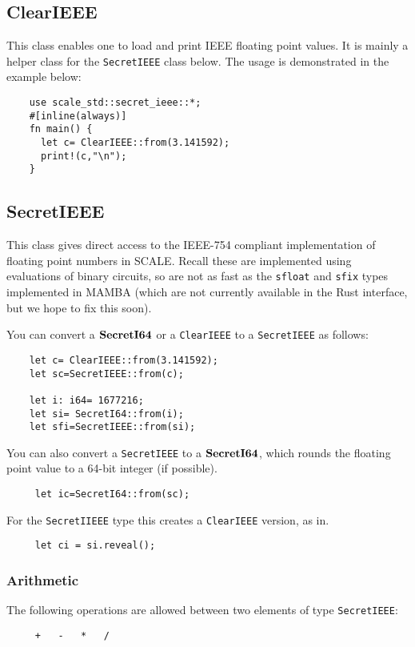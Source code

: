 \subsection{ClearIEEE}
This class enables one to load and print IEEE floating point values.
It is mainly a helper class for the \verb|SecretIEEE| class below.
The usage is demonstrated in the example below:
\begin{lstlisting}
    use scale_std::secret_ieee::*;
    #[inline(always)]
    fn main() {
      let c= ClearIEEE::from(3.141592);
      print!(c,"\n");
    }
\end{lstlisting}

\subsection{SecretIEEE}
This class gives direct access to the IEEE-754 compliant implementation
of floating point numbers in SCALE. Recall these are implemented using
evaluations of binary circuits, so are not as fast as the \verb|sfloat|
and \verb|sfix| types implemented in MAMBA (which are not currently available
in the Rust interface, but we hope to fix this soon).

You can convert a $\mathbf{SecretI64}$ or a \verb|ClearIEEE| to a \verb|SecretIEEE|
as follows:
\begin{lstlisting}
    let c= ClearIEEE::from(3.141592);
    let sc=SecretIEEE::from(c);

    let i: i64= 1677216;
    let si= SecretI64::from(i);
    let sfi=SecretIEEE::from(si);
\end{lstlisting}
You can also convert a  \verb|SecretIEEE| to a $\mathbf{SecretI64}$, which rounds the
floating point value to a 64-bit integer (if possible).
\begin{lstlisting}
     let ic=SecretI64::from(sc);
\end{lstlisting}

For the \verb|SecretIIEEE| type this creates a \verb|ClearIEEE| version, as in.
\begin{lstlisting}
     let ci = si.reveal();
\end{lstlisting}


\subsubsection{Arithmetic}
The following operations are allowed between two elements of type  \verb|SecretIEEE|:
\begin{verbatim}
     +   -   *   /
\end{verbatim}

